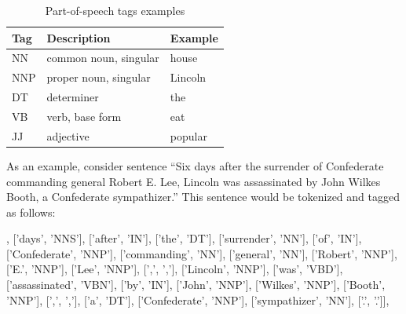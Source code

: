 \documentclass[12pt, twoside]{fithesis2}
\renewcommand{\_}{\leavevmode \kern0.07em\vbox{\hrule width0.4em}}
\begin{document}
\begin{table}[h]
\begin{center}
\begin{tabular}{| l | l | l |}
  \hline
  Tag & Description & Example \\
  \hline \hline
  NN & common noun, singular & house         \\ \hline
  NNP & proper noun, singular & Lincoln     \\ \hline
  DT & determiner & the \\ \hline
  VB & verb, base form & eat \\ \hline
  JJ & adjective & popular \\ \hline
\end{tabular}
\end{center}
\caption{Part-of-speech tags examples \cite{penn-tagset} }
\end{table}

As an example, consider sentence ``Six days after the surrender of Confederate commanding general Robert E. Lee, Lincoln was assassinated by John Wilkes Booth, a Confederate sympathizer.'' This sentence would be tokenized and tagged as follows:
\begin{code}
[['Six', 'CD'], ['days', 'NNS'], ['after', 'IN'], ['the', 'DT'],
['surrender', 'NN'], ['of', 'IN'], ['Confederate', 'NNP'],
['commanding', 'NN'], ['general', 'NN'], ['Robert', 'NNP'],
['E.', 'NNP'], ['Lee', 'NNP'], [',', ','], ['Lincoln', 'NNP'],
['was', 'VBD'], ['assassinated', 'VBN'], ['by', 'IN'],
['John', 'NNP'], ['Wilkes', 'NNP'], ['Booth', 'NNP'],
[',', ','], ['a', 'DT'], ['Confederate', 'NNP'],
['sympathizer', 'NN'], ['.', '.']],
\end{code}
\end{document}

